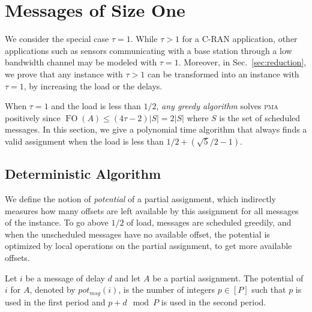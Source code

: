\documentclass[a4paper,UKenglish,cleveref, autoref, thm-restate]{lipics-v2019}
\DeclareMathOperator{\Fo}{FO}
\newcommand\pma{\textsc{pma}\xspace}
\begin{document}
\section{Messages of Size One} \label{sec:small}

We consider the special case $\tau = 1$. While $\tau > 1$ for a C-RAN application, other
applications such as sensors communicating with a base station through a low bandwidth channel may be modeled with $\tau = 1$. Moreover, in Sec.~\ref{sec:reduction}, we prove that any instance with $\tau >1$ can be transformed into an instance with $\tau = 1$,
by increasing the load or the delays.

When $\tau = 1$ and the load is less than $1/2$, \emph{any greedy algorithm} solves \pma positively since $\Fo(A) \leq (4\tau -2)|S| = 2|S|$ where $S$ is the set of scheduled messages. In this section, we give a polynomial time algorithm that always finds a valid assignment when the load is less than $1/2 + (\sqrt{5}/2 -1)$.

\subsection{Deterministic Algorithm}

We define the notion of \emph{potential} of a partial assignment, which indirectly measures how many offsets are left available by this assignment for all messages of the instance. To go above $1/2$ of load, messages are scheduled greedily, and when the unscheduled messages have no available offset, the potential is optimized by local operations on the partial assignment, to get more available offsets. 
 
\begin{definition}
Let $i$ be a message of delay $d$ and let $A$ be a partial assignment.
The potential of $i$ for $A$, denoted by $pot_{msg}(i)$, is the number of integers $p \in [P]$ such that $p$ is used in the first period and $p+d \mod P$ is used in the second period. 
\end{definition}
\end{document}
